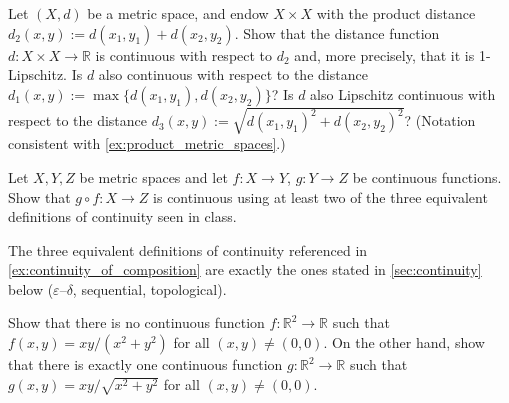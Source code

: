 \begin{exercise}
\label{ex:continuity_of_distance}
Let $(X,d)$ be a metric space, and endow $X \times X$ with the product distance
$d_2(x,y) := d(x_1,y_1) + d(x_2,y_2)$. Show that the distance function
$d : X \times X \to \mathbb{R}$ is continuous with respect to $d_2$ and, more precisely, that it
is 1-Lipschitz. Is $d$ also continuous with respect to the distance
$d_1(x,y) := \max\{d(x_1,y_1), d(x_2,y_2)\}$? Is $d$ also Lipschitz continuous with respect to the
distance $d_3(x,y) := \sqrt{d(x_1,y_1)^2 + d(x_2,y_2)^2}$? (Notation consistent with
\cref{ex:product_metric_spaces}.)
\end{exercise}


\begin{exercise}
\label{ex:continuity_of_composition}
Let $X, Y, Z$ be metric spaces and let $f : X \to Y$, $g : Y \to Z$ be continuous functions. Show
that $g \circ f : X \to Z$ is continuous using at least two of the three equivalent definitions of
continuity seen in class.
\end{exercise}

\begin{remark}
The three equivalent definitions of continuity referenced in \cref{ex:continuity_of_composition} are exactly the ones
stated in \cref{sec:continuity} below (\(\varepsilon\)--\(\delta\), sequential, topological).
\end{remark}


\begin{exercise}
\label{ex:problems_at_origin}
Show that there is no continuous function $f : \mathbb{R}^2 \to \mathbb{R}$ such that
$f(x,y) = xy/(x^2+y^2)$ for all $(x,y) \neq (0,0)$. On the other hand, show that there is exactly
one continuous function $g : \mathbb{R}^2 \to \mathbb{R}$ such that
$g(x,y) = xy/\sqrt{x^2+y^2}$ for all $(x,y) \neq (0,0)$.

\end{exercise}

